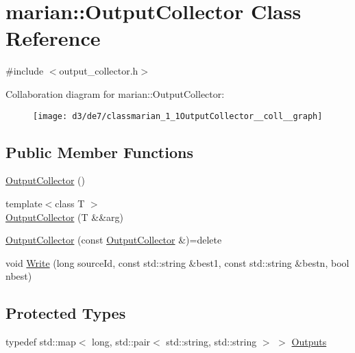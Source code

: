 \hypertarget{classmarian_1_1OutputCollector}{}\section{marian\+:\+:Output\+Collector Class Reference}
\label{classmarian_1_1OutputCollector}


{\ttfamily \#include $<$output\+\_\+collector.\+h$>$}



Collaboration diagram for marian\+:\+:Output\+Collector\+:
\nopagebreak
\begin{figure}[H]
\begin{center}
\leavevmode
\texttt{[image: d3/de7/classmarian\_1\_1OutputCollector\_\_coll\_\_graph]}
\end{center}
\end{figure}
\subsection*{Public Member Functions}
\begin{DoxyCompactItemize}
\item 
\hyperlink{classmarian_1_1OutputCollector_aaf5f787d896df8489817047ae50b69f0}{Output\+Collector} ()
\item 
{\footnotesize template$<$class T $>$ }\\\hyperlink{classmarian_1_1OutputCollector_a6b877d0629db1fe8d5f5c920025cc859}{Output\+Collector} (T \&\&arg)
\item 
\hyperlink{classmarian_1_1OutputCollector_ac0401cb81937a4b38102ead335cf03d9}{Output\+Collector} (const \hyperlink{classmarian_1_1OutputCollector}{Output\+Collector} \&)=delete
\item 
void \hyperlink{classmarian_1_1OutputCollector_aac7fb8a5e89ce5a9bac56a6a414e7fe5}{Write} (long source\+Id, const std\+::string \&best1, const std\+::string \&bestn, bool nbest)
\end{DoxyCompactItemize}
\subsection*{Protected Types}
\begin{DoxyCompactItemize}
\item 
typedef std\+::map$<$ long, std\+::pair$<$ std\+::string, std\+::string $>$ $>$ \hyperlink{classmarian_1_1OutputCollector_a63097e38c39a83640b903e546aa3cbb8}{Outputs}
\end{DoxyCompactItemize}
